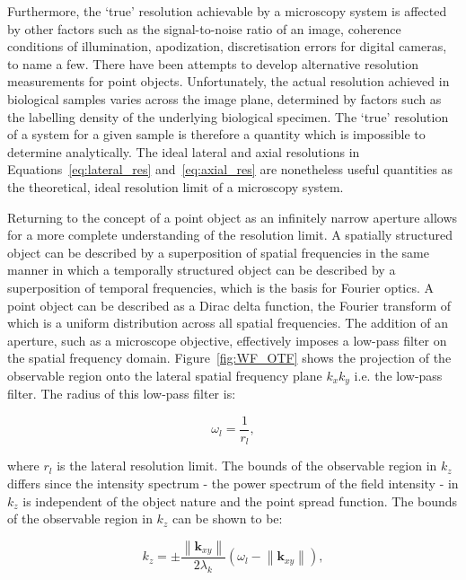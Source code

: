 Furthermore, the `true' resolution achievable by a microscopy system is 
affected by other factors such as the signal-to-noise ratio of an image, 
coherence conditions of illumination, apodization, discretisation errors for 
digital cameras, to name a few\cite{den1997resolution}. There have been 
attempts to develop alternative resolution measurements for point 
objects\cite{ram2006beyond}. Unfortunately, the actual resolution achieved in 
biological samples varies across the image plane, determined by factors such 
as the labelling density of the underlying biological 
specimen\cite{culley2017nanoj}. The `true' resolution of a system for a given 
sample is therefore a quantity which is impossible to determine analytically. 
The ideal lateral and axial resolutions in Equations~\ref{eq:lateral_res} 
and~\ref{eq:axial_res} are nonetheless useful quantities as the theoretical, 
ideal resolution limit of a microscopy system.

Returning to the concept of a point object as an infinitely narrow aperture allows 
for a more complete understanding of the resolution limit. A spatially structured 
object can be described by a superposition of spatial frequencies in the same 
manner in which a temporally structured object can be described by a superposition 
of temporal frequencies, which is the basis for Fourier 
optics\cite{goodman2005introduction}. A point object can be described as a Dirac
delta function, the Fourier transform of which is a uniform distribution across all
spatial frequencies. The addition of an aperture, such as a microscope objective, 
effectively imposes a low-pass filter on the spatial frequency domain. 
Figure~\ref{fig:WF_OTF} shows the projection of the observable region onto the 
lateral spatial frequency plane $k_{x}k_{y}$ i.e. the low-pass filter. The radius of
this low-pass filter is: 

\begin{equation}\label{eq:lateral_spatial_freq_res}
\omega_{l} = \frac{1}{r_{l}},
\end{equation}

where $r_{l}$ is the lateral resolution limit. The bounds of the observable region 
in $k_{z}$ differs since the intensity spectrum - the power spectrum of the 
field intensity - in $k_{z}$ is independent of the object nature and the point
spread function\cite{frieden1967optical}. The bounds of the observable region in
$k_{z}$ can be shown to be:

\begin{equation}\label{eq:observable_region_kz}
k_{z} = \pm\frac{\left\|\textbf{k}_{xy}\right\|}{2\lambda_{k}}(\omega_{l} - \left\|\textbf{k}_{xy}\right\|),
\end{equation}

